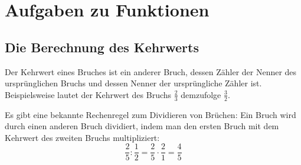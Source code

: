 \section{Aufgaben zu Funktionen}

\subsection{Die Berechnung des Kehrwerts}

Der Kehrwert eines Bruches ist ein anderer Bruch, dessen Zähler der Nenner des ursprünglichen Bruchs und dessen Nenner der ursprüngliche Zähler ist. Beispielsweise lautet der Kehrwert des Bruchs $\frac{2}{3}$ demzufolge $\frac{3}{2}$.

Es gibt eine bekannte Rechenregel zum Dividieren von Brüchen: Ein Bruch wird durch einen anderen Bruch dividiert, indem man den ersten Bruch mit dem Kehrwert des zweiten Bruchs multipliziert:
\[
\frac{2}{5} : \frac{1}{2} = \frac{2}{5} \cdot \frac{2}{1} = \frac{4}{5}
\]